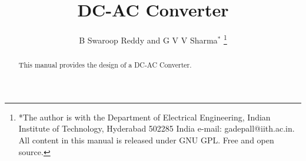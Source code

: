 \documentclass[journal,12pt,twocolumn]{IEEEtran}
\begin{document}









\def\putbox#1#2#3{\makebox[0in][l]{\makebox[#1][l]{}\raisebox{\baselineskip}[0in][0in]{\raisebox{#2}[0in][0in]{#3}}}}
     \def\rightbox#1{\makebox[0in][r]{#1}}
     \def\centbox#1{\makebox[0in]{#1}}
     \def\topbox#1{\raisebox{-\baselineskip}[0in][0in]{#1}}
     \def\midbox#1{\raisebox{-0.5\baselineskip}[0in][0in]{#1}}

\vspace{3cm}

\title{ 
DC-AC Converter
}

\author{B Swaroop Reddy and  G V V Sharma$^{*}$%
	\thanks{*The author is with the Department
		of Electrical Engineering, Indian Institute of Technology, Hyderabad
		502285 India e-mail:  gadepall@iith.ac.in. All content in this manual is released under GNU GPL.  Free and open source.}
	
}	

\maketitle

\tableofcontents
\bigskip

\begin{abstract}
	
	This manual provides the design of a DC-AC Converter.
	
\end{abstract}

\end{document}
